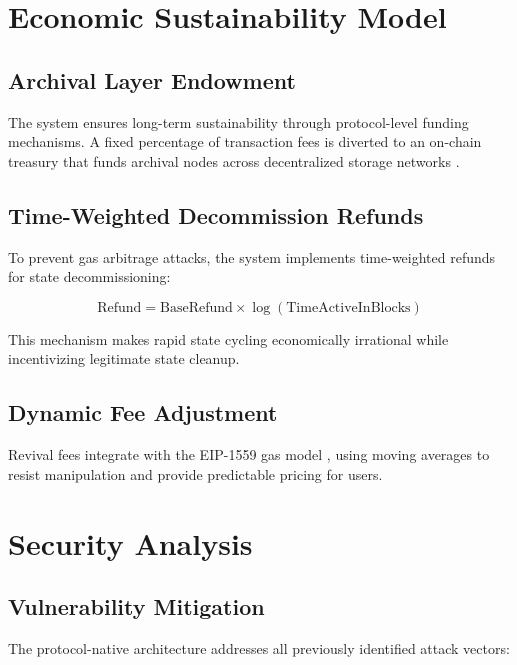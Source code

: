 \documentclass{article}
\begin{document}
\section{Economic Sustainability Model}

\subsection{Archival Layer Endowment}

The system ensures long-term sustainability through protocol-level funding mechanisms. A fixed percentage of transaction fees is diverted to an on-chain treasury that funds archival nodes across decentralized storage networks \cite{williams2018arweave,protocollabs2017filecoin}.

\subsection{Time-Weighted Decommission Refunds}

To prevent gas arbitrage attacks, the system implements time-weighted refunds for state decommissioning:

\begin{equation}
\text{Refund} = \text{BaseRefund} \times \log(\text{TimeActiveInBlocks})
\end{equation}

This mechanism makes rapid state cycling economically irrational while incentivizing legitimate state cleanup.

\subsection{Dynamic Fee Adjustment}

Revival fees integrate with the EIP-1559 gas model \cite{buterin2019eip1559}, using moving averages to resist manipulation and provide predictable pricing for users.

\section{Security Analysis}

\subsection{Vulnerability Mitigation}

The protocol-native architecture addresses all previously identified attack vectors:
\end{document}
